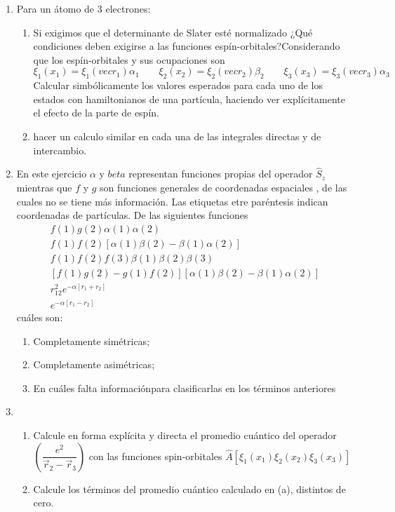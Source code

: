 \documentclass[]{article}
\begin{document}
\begin{enumerate}
\item Para un átomo de 3 electrones:
  \begin{enumerate}
  \item Si exigimos que el determinante de Slater esté normalizado ¿Qué condiciones deben exigirse a las funciones espín-orbitales?Considerando que los espín-orbitales y sus ocupaciones son
    \begin{equation*}
      \xi_1(x_1)=\xi_1(vec{r}_1)\alpha_1\qquad\xi_2(x_2)=\xi_2(vec{r}_2)\beta_2\qquad\xi_3(x_3)=\xi_3(vec{r}_3)\alpha_3
    \end{equation*}
Calcular simbólicamente los valores esperados  para cada uno de los estados con hamiltonianos de una partícula, haciendo ver explícitamente  el efecto de la parte de espín.
\item hacer un calculo similar en cada una de las integrales directas y de intercambio.

  \end{enumerate}
\item En este ejercicio $\alpha$ y $beta$ representan funciones propias del operador $\hat{S}_z$ mientras que $f$ y $g$ son funciones generales de coordenadas espaciales , de las cuales no se tiene más información. Las etiquetas  etre paréntesis indican coordenadas de partículas. De las siguientes funciones
  \begin{eqnarray*}
    f(1)g(2)\alpha(1)\alpha(2)\\
    f(1)f(2)\left[\alpha(1)\beta(2)-\beta(1)\alpha(2)\right]\\
    f(1)f(2)f(3)\beta(1)\beta(2)\beta(3)\\
    \left[f(1)g(2)-g(1)f(2)\right]\left[\alpha(1)\beta(2)-\beta(1)\alpha(2)\right]\\
    r^2_{12}e^{-\alpha\left[r_1+r_2\right]}\\
    e^{-\alpha\left[r_1-r_2\right]}
  \end{eqnarray*}
cuáles son:

    \begin{enumerate}
    \item Completamente simétricas;
    \item Completamente asimétricas;
    \item En cuáles falta informaciónpara clasificarlas en los términos anteriores
    \end{enumerate}
  \item
    \begin{enumerate}
    \item Calcule en forma explícita y directa el promedio cuántico del operador $\left(\dfrac{e^2}{\vec{r}_2-\vec{r}_3}\right)$ con las funciones spin-orbitales $\hat{A}\left[\xi_1(x_1)\xi_2(x_2)\xi_3(x_3)\right]$
    \item Calcule los términos del promedio cuántico calculado en (a), distintos de cero.
    \end{enumerate}

\end{enumerate}
\end{document}
